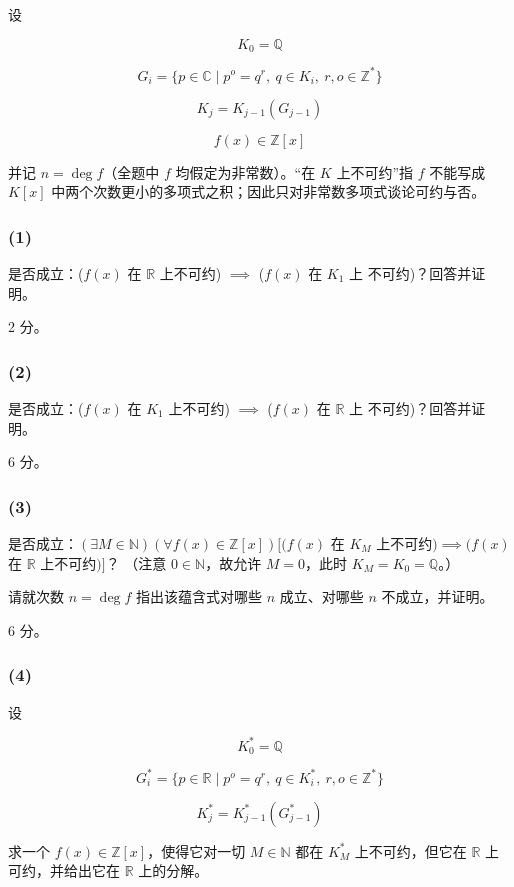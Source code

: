 \documentclass[UTF8]{ctexart}
\begin{document}
设

$$K_0=\mathbb{Q}$$

$$G_i=\{p\in \mathbb{C}\mid p^o=q^r,\ q\in K_i,\ r,o\in \mathbb{Z}^*\}$$

$$K_j=K_{j-1}(G_{j-1})$$

$$f(x)\in \mathbb{Z}[x]$$

并记 $n=\deg f$（全题中 $f$ 均假定为非常数）。``在 $K$ 上不可约''指 $f$
不能写成 $K[x]$ 中两个次数更小的多项式之积；因此只对非常数多项式谈论可约与否。

\subsubsection{(1)}

是否成立：($f(x)$ 在 $\mathbb{R}$ 上不可约) $\implies$ ($f(x)$ 在 $K_1$ 上
不可约)？回答并证明。

2 分。

\subsubsection{(2)}

是否成立：($f(x)$ 在 $K_1$ 上不可约) $\implies$ ($f(x)$ 在 $\mathbb{R}$ 上
不可约)？回答并证明。

6 分。

\subsubsection{(3)}

是否成立：$(\exists M \in \mathbb{N})(\forall f(x) \in \mathbb{Z}[x])[(f(x)$
在 $K_M$ 上不可约$) \implies (f(x)$ 在 $\mathbb{R}$ 上不可约$)]$？
（注意 $0\in\mathbb{N}$，故允许 $M=0$，此时 $K_M=K_0=\mathbb{Q}$。）

请就次数 $n=\deg f$ 指出该蕴含式对哪些 $n$ 成立、对哪些 $n$ 不成立，并证明。

6 分。

\subsubsection{(4)}

设

$$K^*_0=\mathbb{Q}$$

$$G^*_i=\{p\in \mathbb{R}\mid p^o=q^r,\ q\in K^*_i,\ r,o\in \mathbb{Z}^*\}$$

$$K^*_j=K^*_{j-1}(G^*_{j-1})$$

求一个 $f(x) \in \mathbb{Z}[x]$，使得它对一切 $M \in \mathbb{N}$ 都在
$K^*_M$ 上不可约，但它在 $\mathbb{R}$ 上可约，并给出它在 $\mathbb{R}$ 上的分解。
\end{document}
